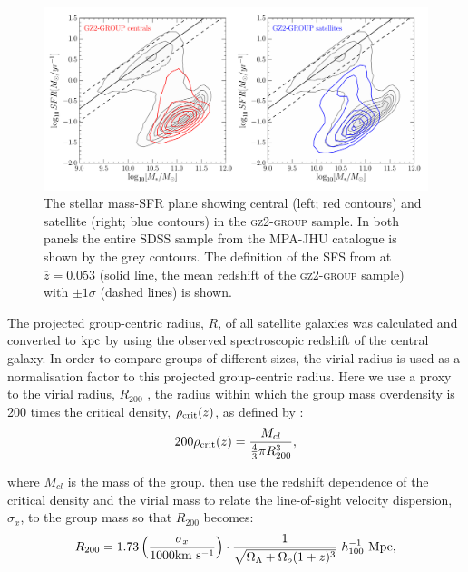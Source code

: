 \documentclass[useAMS,usenatbib]{mn2e}
\begin{document}
\begin{figure}
\centering
\includegraphics[width=\textwidth]{sfr_mass_quenched_centrals_satellites_gz2_group.pdf}
\caption[Stellar mass-SFR plane for the centrals and satellites of the \textsc{gz2-group} sample]{The stellar mass-SFR plane showing central (left; red contours) and satellite (right; blue contours) in the \textsc{gz2-group} sample. In both panels the entire SDSS sample from the MPA-JHU catalogue is shown by the grey contours. The definition of the SFS from \cite{peng10} at $\overline{z} = 0.053$ (solid line, the mean redshift of the \textsc{gz2-group} sample) with $\pm1\sigma$ (dashed lines) is shown.}
\label{fig:sfrmass}
\end{figure}


The projected group-centric radius, $R$, of all satellite galaxies was calculated and converted to $\rm{kpc}$ by using the observed spectroscopic redshift of the central galaxy. In order to compare groups of different sizes, the virial radius is used as a normalisation factor to this projected group-centric radius. Here we use a proxy to the virial radius, $R_{200}$ \citep[see][]{navarro95}, the radius within which the group mass overdensity is 200 times the critical density, $\rho_{\rm{crit}}(z)$, as defined by \citealt{finn05}:
\begin{equation}\label{eq:overdense}
200\rho_{\rm{crit}}(z) = \frac{M_{cl}}{\frac{4}{3}\pi R_{200}^3},
\end{equation}

where $M_{cl}$ is the mass of the group. \citeauthor{finn05} then use the redshift dependence of the critical density and the virial mass to relate the line-of-sight velocity dispersion, $\sigma_x$, to the group mass so that $R_{200}$ becomes:
\begin{equation}\label{eq:r200}
R_{200} = 1.73 \left ( \frac{\sigma_x}{1000 \rm{km}~\rm{s}^{-1}} \right) \cdot \frac{1}{\sqrt{\Omega_{\Lambda} +\Omega_o(1+z)^3}} ~ h_{100}^{-1} ~\rm{Mpc}, 
\end{equation}
\end{document}
